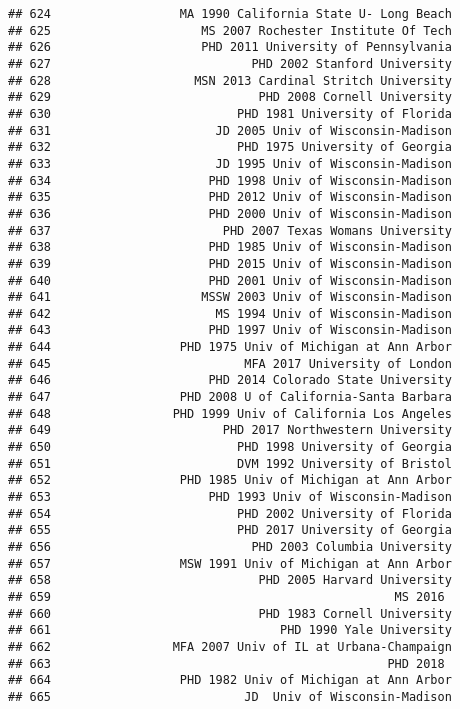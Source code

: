 \documentclass[
]{article}
\begin{document}
\begin{verbatim}
## 624                  MA 1990 California State U- Long Beach
## 625                     MS 2007 Rochester Institute Of Tech
## 626                     PHD 2011 University of Pennsylvania
## 627                            PHD 2002 Stanford University
## 628                    MSN 2013 Cardinal Stritch University
## 629                             PHD 2008 Cornell University
## 630                          PHD 1981 University of Florida
## 631                       JD 2005 Univ of Wisconsin-Madison
## 632                          PHD 1975 University of Georgia
## 633                       JD 1995 Univ of Wisconsin-Madison
## 634                      PHD 1998 Univ of Wisconsin-Madison
## 635                      PHD 2012 Univ of Wisconsin-Madison
## 636                      PHD 2000 Univ of Wisconsin-Madison
## 637                        PHD 2007 Texas Womans University
## 638                      PHD 1985 Univ of Wisconsin-Madison
## 639                      PHD 2015 Univ of Wisconsin-Madison
## 640                      PHD 2001 Univ of Wisconsin-Madison
## 641                     MSSW 2003 Univ of Wisconsin-Madison
## 642                       MS 1994 Univ of Wisconsin-Madison
## 643                      PHD 1997 Univ of Wisconsin-Madison
## 644                  PHD 1975 Univ of Michigan at Ann Arbor
## 645                           MFA 2017 University of London
## 646                      PHD 2014 Colorado State University
## 647                  PHD 2008 U of California-Santa Barbara
## 648                 PHD 1999 Univ of California Los Angeles
## 649                        PHD 2017 Northwestern University
## 650                          PHD 1998 University of Georgia
## 651                          DVM 1992 University of Bristol
## 652                  PHD 1985 Univ of Michigan at Ann Arbor
## 653                      PHD 1993 Univ of Wisconsin-Madison
## 654                          PHD 2002 University of Florida
## 655                          PHD 2017 University of Georgia
## 656                            PHD 2003 Columbia University
## 657                  MSW 1991 Univ of Michigan at Ann Arbor
## 658                             PHD 2005 Harvard University
## 659                                                MS 2016 
## 660                             PHD 1983 Cornell University
## 661                                PHD 1990 Yale University
## 662                 MFA 2007 Univ of IL at Urbana-Champaign
## 663                                               PHD 2018 
## 664                  PHD 1982 Univ of Michigan at Ann Arbor
## 665                           JD  Univ of Wisconsin-Madison

\end{verbatim}
\end{document}
